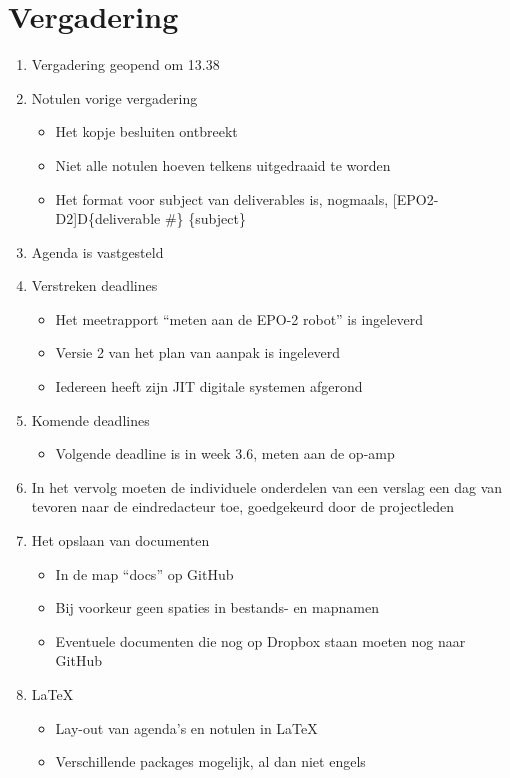 \documentclass{report}
\begin{document}
\section*{Vergadering}
\begin{enumerate}

	\item Vergadering geopend om 13.38
	\item Notulen vorige vergadering
	\begin{itemize}
		\item Het kopje besluiten ontbreekt
		\item Niet alle notulen hoeven telkens uitgedraaid te worden
		\item Het format voor subject van deliverables is, nogmaals, [EPO2-D2]D\{deliverable \#\} \{subject\}
	\end{itemize}
	\item Agenda is vastgesteld
	\item Verstreken deadlines
	\begin{itemize}
		\item Het meetrapport ``meten aan de EPO-2 robot'' is ingeleverd
		\item Versie 2 van het plan van aanpak is ingeleverd
		\item Iedereen heeft zijn JIT digitale systemen afgerond
	\end{itemize}
	\item Komende deadlines
	\begin{itemize}
		\item Volgende deadline is in week 3.6, meten aan de op-amp
	\end{itemize}
	\item In het vervolg moeten de individuele onderdelen van een verslag een dag van tevoren naar de eindredacteur toe, goedgekeurd door de projectleden
	\item Het opslaan van documenten
	\begin{itemize}
		\item In de map ``docs'' op GitHub
		\item Bij voorkeur geen spaties in bestands- en mapnamen
		\item Eventuele documenten die nog op Dropbox staan moeten nog naar GitHub
	\end{itemize}
	\item LaTeX
	\begin{itemize}
		\item Lay-out van agenda's en notulen in LaTeX
		\item Verschillende packages mogelijk, al dan niet engels

\end{itemize}
\end{enumerate}
\end{document}
